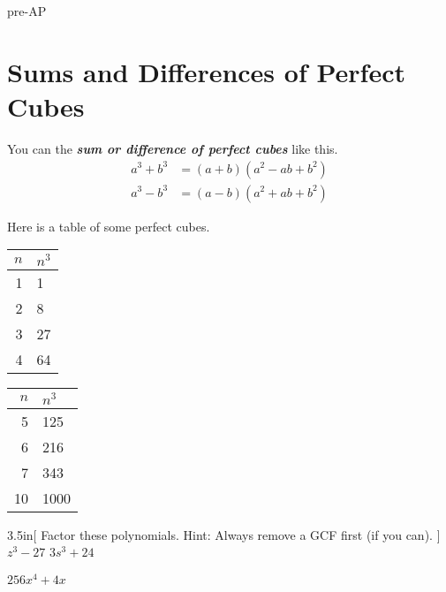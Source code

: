 \begin{taggedblock}{pre-AP}
\section{Sums and Differences of Perfect Cubes}


\begin{myCenteredBox}[width=4.75in,]
    You can  the {\bfseries\itshape sum or difference of perfect cubes} like this.
    \Large
    \begin{align*}
        a^3 + b^3 &= (a+b) (a^2 - ab + b^2 ) \\
        a^3 - b^3 &= (a-b) (a^2 + ab + b^2 ) 
    \end{align*}
\end{myCenteredBox}

Here is a table of some perfect cubes.

\hfil
\begin{minipage}{0.2\textwidth}
    \begin{center}
        \large
        \begin{tabular}{|r|l|}
            \toprule
            $n$ & $n^3$ \\
            \midrule
            1 & 1 \\
            2 & 8 \\
            3 & 27 \\
            4 & 64\\
            \bottomrule
        \end{tabular}
    \end{center}
\end{minipage}
\begin{minipage}{0.2\textwidth}
    \begin{center}
        \large
        \begin{tabular}{|r|l|}
            \toprule
            $n$ & $n^3$ \\
            \midrule
            5 & 125\\
            6 & 216 \\
            7 & 343 \\
            10 & 1000 \\
            \bottomrule
        \end{tabular}
    \end{center}
\end{minipage}
\hfil



\begin{my2Problems}[\large]{3.5in}[
    Factor these polynomials. 
    Hint: Always remove a GCF first (if you can).
    ]
    {
        $ z^3 - 27 $
    }
    {
        $ 3s^3 + 24 $
    }
\end{my2Problems}

\begin{myProblem}[\large]{3.5in}
    {
        $ 256x^4 + 4x $
    }
\end{myProblem}


\end{taggedblock}
